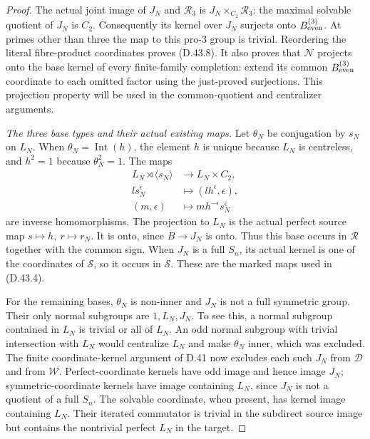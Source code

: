 \begin{proof}
The actual joint image of
$J_N$ and $\mathcal R_3$
is $J_N\times_{C_2}\mathcal R_3$:
the maximal solvable quotient
of $J_N$ is $C_2$.
Consequently its kernel over
$J_N$ surjects onto
$B_{\rm even}^{(3)}$.
At primes other than three
the map to this pro-$3$
group is trivial. Reordering
the literal fibre-product
coordinates proves (D.43.8).
It also proves that
$\mathcal N$ projects onto
the base kernel of every
finite-family completion:
extend its common
$B_{\rm even}^{(3)}$
coordinate to each omitted
factor using the just-proved
surjections. This projection
property will be used in
the common-quotient and
centralizer arguments.

\emph{The three base types and their actual existing maps.}
Let $\theta_N$ be conjugation
by $s_N$ on $L_N$. When
$\theta_N=\operatorname{Int}(h)$,
the element $h$ is unique
because $L_N$ is centreless,
and $h^2=1$ because
$\theta_N^2=1$. The maps
\[
 \begin{aligned}
 L_N\rtimes\langle s_N\rangle
       &\longrightarrow L_N\times C_2,\\
       l s_N^\epsilon&\longmapsto(lh^\epsilon,\epsilon),\\
 (m,\epsilon)&\longmapsto m h^{-\epsilon}s_N^\epsilon
 \end{aligned}                                                 \tag{D.43.13}
\]
are inverse homomorphisms.
The projection to $L_N$
is the actual perfect
source map
$s\mapsto h,\ r\mapsto r_N$.
It is onto, since
$B\to J_N$ is onto.
Thus this base occurs in
$\mathcal R$ together
with the common sign.
When $J_N$ is a full
$S_n$, its actual kernel
is one of the coordinates
of $\mathscr S$, so it
occurs in $\mathcal S$.
These are the marked
maps used in (D.43.4).

For the remaining bases,
$\theta_N$ is non-inner
and $J_N$ is not a full
symmetric group. Their
only normal subgroups
are $1,L_N,J_N$. To see
this, a normal subgroup
contained in $L_N$ is
trivial or all of $L_N$.
An odd normal subgroup
with trivial intersection
with $L_N$ would centralize
$L_N$ and make
$\theta_N$ inner, which
was excluded. The
finite coordinate-kernel
argument of D.41 now
excludes each such
$J_N$ from $\mathcal D$
and from $\mathcal W$.
Perfect-coordinate
kernels have odd image
and hence image $J_N$;
symmetric-coordinate
kernels have image
containing $L_N$, since
$J_N$ is not a quotient
of a full $S_n$.
The solvable coordinate,
when present, has kernel
image containing $L_N$.
Their iterated commutator
is trivial in the
subdirect source image
but contains the
nontrivial perfect
$L_N$ in the target.


\end{proof}
